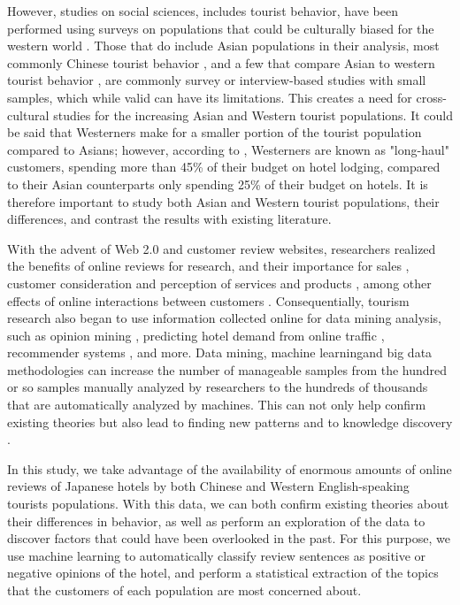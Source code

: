 However, \DIFdelbegin {}\DIFdelend \DIFaddbegin {}\DIFaddend studies on social sciences, \DIFdelbegin {}\DIFdelend \DIFaddbegin {}\DIFaddend includes tourist behavior, have been performed using surveys on populations that could be culturally biased for the western world \cite[][]{nielsen2017, jones2010WEIRD, guaratne2009, hogan1978biases}. Those that do include Asian populations in their analysis, most commonly \DIFaddbegin {}\DIFaddend Chinese tourist behavior \cite[e.g.][]{liu2019, chang2010, dongyang2015}, and a few that compare Asian to western tourist behavior \cite[e.g.][]{choi2000}, are commonly survey or interview-based studies with small samples, which while valid can have its limitations. This creates a need for cross-cultural studies for the increasing Asian and Western tourist populations. It could be said that Westerners make for a smaller portion of the tourist population compared to Asians; however, according to \cite{choi2000}, Westerners are known as "long-haul" customers, spending more than 45\% of their budget on hotel lodging, compared to their Asian counterparts only spending 25\% of their budget on hotels. It is therefore important to study both Asian and Western tourist populations, their differences, and contrast the results with existing literature. 

With the advent of Web 2.0 and customer review websites, researchers realized the benefits of online reviews for research, and their importance for sales  \cite[][]{ye2009, basuroy2003}, customer consideration \cite[][]{vermeulen2009} and perception of services and products \cite[][]{browning2013}, among other effects of online interactions between customers \cite[e.g.][]{xiang2010, ren2019}. Consequentially, tourism research also began to use information collected online for data mining analysis, such as opinion mining \cite[e.g.][]{hu2017436}, predicting hotel demand from online traffic \cite[][]{yang2014}, recommender systems \cite[e.g.][]{loh2003}, and more. Data mining, machine learning\DIFaddbegin \DIFadd{, }\DIFaddend and big data methodologies can increase the number of manageable samples from the hundred or so samples manually analyzed by researchers to the hundreds of thousands that are automatically analyzed by machines. This can not only help confirm existing theories but also lead to finding new patterns and to knowledge discovery \cite[][]{fayyad1996data}. 

In this study, we take advantage of the availability of enormous amounts of online reviews of Japanese hotels by both Chinese and Western English-speaking tourists populations. With this data, we can both confirm existing theories about their differences in behavior, as well as perform an exploration of the data to discover factors that could have been overlooked in the past. For this purpose, we use machine learning to automatically classify review sentences as positive or negative opinions of the hotel, and perform a statistical extraction of the topics that the customers of each population are most concerned about.


